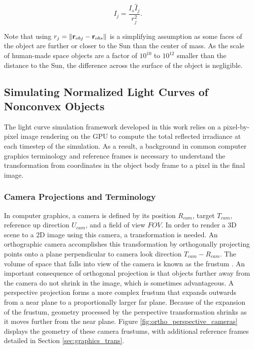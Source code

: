 \begin{equation} \label{eq:lc_func_norm_to_irrad}
  I_{j} = \frac{I_s \hat{I}_j}{r_j^2}.
\end{equation}

Note that using $r_j = \| \mathbf{r}_{obj} - \mathbf{r}_{obs} \|$ is a simplifying assumption as some faces of the object are further or closer to the Sun than the center of mass. As the scale of human-made space objects are a factor of $10^{10}$ to $10^{12}$ smaller than the distance to the Sun, the difference across the surface of the object is negligible.

\subsection{Simulating Normalized Light Curves of Nonconvex Objects}

The light curve simulation framework developed in this work relies on a pixel-by-pixel image rendering on the GPU to compute the total reflected irradiance at each timestep of the simulation. As a result, a background in common computer graphics terminology and reference frames is necessary to understand the transformation from coordinates in the object body frame to a pixel in the final image.

\subsubsection{Camera Projections and Terminology}

In computer graphics, a camera is defined by its position $R_{cam}$, target $T_{cam}$, reference up direction $U_{cam}$, and a field of view $FOV$. In order to render a 3D scene to a 2D image using this camera, a transformation is needed. An orthographic camera accomplishes this transformation by orthogonally projecting points onto a plane perpendicular to camera look direction $T_{cam} - R_{cam}$. The volume of space that falls into view of the camera is known as the frustum \cite{shirley2009}. An important consequence of orthogonal projection is that objects further away from the camera do not shrink in the image, which is sometimes advantageous. A perspective projection forms a more complex frustum that expands outwards from a near plane to a proportionally larger far plane. Because of the expansion of the frustum, geometry processed by the perspective transformation shrinks as it moves further from the near plane. Figure \ref{fig:ortho_perspective_cameras} displays the geometry of these camera frustums, with additional reference frames detailed in Section \ref{sec:graphics_trans}.

